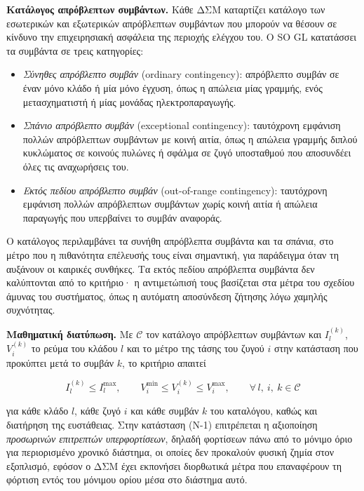 \textbf{Κατάλογος απρόβλεπτων συμβάντων.} Κάθε ΔΣΜ καταρτίζει κατάλογο των εσωτερικών και
εξωτερικών απρόβλεπτων συμβάντων που μπορούν να θέσουν σε κίνδυνο την επιχειρησιακή ασφάλεια
της περιοχής ελέγχου του. Ο SO GL κατατάσσει τα συμβάντα σε τρεις κατηγορίες:

\begin{itemize}
\item \emph{Σύνηθες απρόβλεπτο συμβάν} (ordinary contingency): απρόβλεπτο συμβάν σε έναν
      μόνο κλάδο ή μία μόνο έγχυση, όπως η απώλεια μίας γραμμής, ενός μετασχηματιστή ή μίας
      μονάδας ηλεκτροπαραγωγής.
\item \emph{Σπάνιο απρόβλεπτο συμβάν} (exceptional contingency): ταυτόχρονη εμφάνιση πολλών
      απρόβλεπτων συμβάντων με κοινή αιτία, όπως η απώλεια γραμμής διπλού κυκλώματος σε κοινούς
      πυλώνες ή σφάλμα σε ζυγό υποσταθμού που αποσυνδέει όλες τις αναχωρήσεις του.
\item \emph{Εκτός πεδίου απρόβλεπτο συμβάν} (out-of-range contingency): ταυτόχρονη εμφάνιση
      πολλών απρόβλεπτων συμβάντων χωρίς κοινή αιτία ή απώλεια παραγωγής που υπερβαίνει το
      συμβάν αναφοράς.
\end{itemize}

Ο κατάλογος περιλαμβάνει τα συνήθη απρόβλεπτα συμβάντα και τα σπάνια, στο μέτρο που η
πιθανότητα επέλευσής τους είναι σημαντική, για παράδειγμα όταν τη αυξάνουν οι καιρικές
συνθήκες. Τα εκτός πεδίου απρόβλεπτα συμβάντα δεν καλύπτονται από το κριτήριο· η
αντιμετώπισή τους βασίζεται στα μέτρα του σχεδίου άμυνας του συστήματος, όπως η αυτόματη
αποσύνδεση ζήτησης λόγω χαμηλής συχνότητας.

\textbf{Μαθηματική διατύπωση.} Με $\mathcal{C}$ τον κατάλογο απρόβλεπτων συμβάντων και
$I_l^{(k)}$, $V_i^{(k)}$ το ρεύμα του κλάδου $l$ και το μέτρο της τάσης του ζυγού $i$ στην
κατάσταση που προκύπτει μετά το συμβάν $k$, το κριτήριο απαιτεί

\begin{equation}
I_l^{(k)} \le I_l^{\max}, \qquad V_i^{\min} \le V_i^{(k)} \le V_i^{\max},
\qquad \forall\, l,\ i,\ k \in \mathcal{C}
\label{eq:n1}
\end{equation}

για κάθε κλάδο $l$, κάθε ζυγό $i$ και κάθε συμβάν $k$ του καταλόγου, καθώς και διατήρηση της
ευστάθειας. Στην κατάσταση (N-1) επιτρέπεται η αξιοποίηση
\emph{προσωρινών επιτρεπτών υπερφορτίσεων}, δηλαδή φορτίσεων πάνω από το μόνιμο όριο για
περιορισμένο χρονικό διάστημα, οι οποίες δεν προκαλούν φυσική ζημία στον εξοπλισμό, εφόσον ο
ΔΣΜ έχει εκπονήσει διορθωτικά μέτρα που επαναφέρουν τη φόρτιση εντός του μόνιμου ορίου μέσα
στο διάστημα αυτό.

